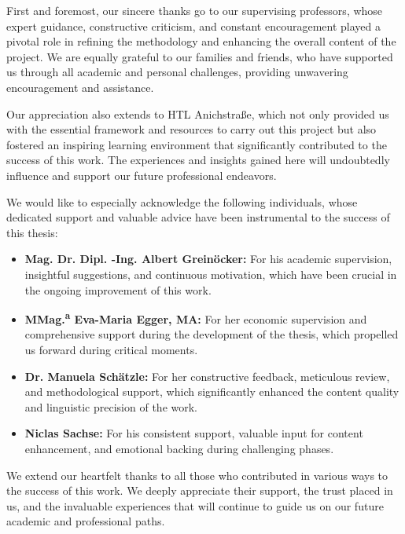 First and foremost, our sincere thanks go to our supervising professors, whose expert guidance, constructive criticism, and constant encouragement played a pivotal role in refining the methodology and enhancing the overall content of the project. We are equally grateful to our families and friends, who have supported us through all academic and personal challenges, providing unwavering encouragement and assistance.

Our appreciation also extends to HTL Anichstraße, which not only provided us with the essential framework and resources to carry out this project but also fostered an inspiring learning environment that significantly contributed to the success of this work. The experiences and insights gained here will undoubtedly influence and support our future professional endeavors.

We would like to especially acknowledge the following individuals, whose dedicated support and valuable advice have been instrumental to the success of this thesis:
\begin{itemize}
    \item \textbf{Mag. Dr. Dipl. -Ing. Albert Greinöcker:} For his academic supervision, insightful suggestions, and continuous motivation, which have been crucial in the ongoing improvement of this work.
    \item \textbf{MMag.\textsuperscript{a} Eva-Maria Egger, MA:} For her economic supervision and comprehensive support during the development of the thesis, which propelled us forward during critical moments.
    \item \textbf{Dr. Manuela Schätzle:} For her constructive feedback, meticulous review, and methodological support, which significantly enhanced the content quality and linguistic precision of the work.
    \item \textbf{Niclas Sachse:} For his consistent support, valuable input for content enhancement, and emotional backing during challenging phases.
\end{itemize}


We extend our heartfelt thanks to all those who contributed in various ways to the success of this work. We deeply appreciate their support, the trust placed in us, and the invaluable experiences that will continue to guide us on our future academic and professional paths.

